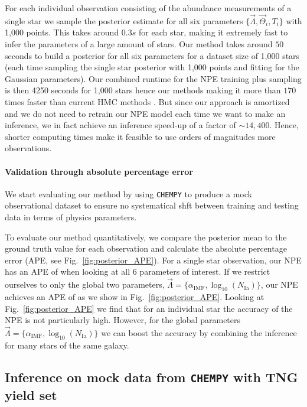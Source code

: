 \documentclass{aa}
\begin{document}
For each individual observation consisting of the abundance measurements of a single star we sample the posterior estimate for all six parameters $\{\vec\Lambda,\vec\Theta_i,T_i\}$ with 1,000 points. This takes around $0.3s$ for each star, making it extremely fast to infer the parameters of a large amount of stars. Our method takes around $50$ seconds to build a posterior for all six parameters for a dataset size of 1,000 stars (each time sampling the single star posterior with 1,000 points and fitting for the Gaussian parameters). Our combined runtime for the NPE training plus sampling is then 4250 seconds for 1,000 stars hence our methods making it more than $170$ times faster than current HMC methods \citep[cf.][who need $40$h for only 200 stars]{Philcox_2019}. But since our approach is amortized and we do not need to retrain our NPE model each time we want to make an inference, we in fact achieve an inference speed-up of a factor of $\sim14,400$.
Hence, shorter computing times make it feasible to use orders of magnitudes more observations.

\paragraph{Validation through absolute percentage error}
We start evaluating our method by using \texttt{CHEMPY} to produce a mock observational dataset to ensure no systematical shft between training and testing data in terms of physics parameters.

To evaluate our method quantitatively, we compare the posterior mean to the ground truth value for each observation and calculate the absolute percentage error (APE, see Fig.~\ref{fig:posterior_APE}). For a single star observation, our NPE has an APE of  when looking at all 6 parameters of interest. If we restrict ourselves to only the global two parameters, $\vec\Lambda = \{\alpha_\mathrm{IMF},\log_{10}(N_\mathrm{Ia})\}$, our NPE achieves an APE of  as we show in Fig.~\ref{fig:posterior_APE}. Looking at Fig.~\ref{fig:posterior_APE} we find that for an individual star the accuracy of the NPE is not particularly high. However, for the global parameters $\vec\Lambda = \{\alpha_\mathrm{IMF},\log_{10}(N_\mathrm{Ia})\}$ we can boost the accuracy by combining the inference for many stars of the same galaxy.

\subsection{Inference on mock data from \texttt{CHEMPY} with TNG yield set}
\label{subsec:chempy_tng}
\end{document}
